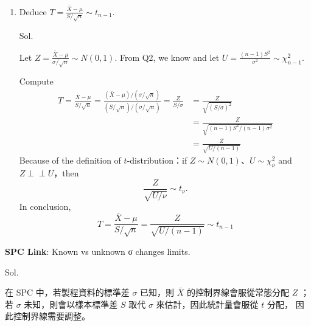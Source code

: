 \documentclass[a4paper, 12pt]{article}  %
\begin{document}
\begin{enumerate}
        Then divide by $\sigma^2$:
        $$\sum_{i=1}^n\left(\frac{X_i-\mu}{\sigma}\right)^2=\sum_{i=1}^n\left(\frac{X_i-\bar X}{\sigma}\right)^2+\left(\frac{\bar X-\mu}{\sigma /\sqrt n}\right)^2.$$
        Let
        $$U=\sum_{i=1}^n\left(\frac{X_i-\mu}{\sigma}\right)^2,　V=\sum_{i=1}^n\left(\frac{X_i-\bar X}{\sigma}\right)^2,　W=\left(\frac{\bar X-\mu}{\sigma /\sqrt n}\right)^2.$$
        Then $U=V+W$, and we can know
        $$U=\sum_{i=1}^n Z_i^2 \sim \chi^2_n,　V=\frac{1}{\sigma^2}\sum_{i=1}^n (X_i-\bar X)^2=\frac{(n-1)S^2}{\sigma^2},$$
        also $\bar X\sim N(\mu,\sigma^2/n)$, hence $$\frac{\bar X-\mu}{\sigma /\sqrt n}\sim N(0,1)\Rightarrow W\sim\chi^2_1.$$
        By (1) and $W$ is a function of $\bar X$ while
        $V=\frac{(n-1)S^2}{\sigma^2}$ is a function of $S^2$, we have $$V\perp \!\!\! \perp W.$$
        From $U=V+W$ and independence, we have $$M_U(t)=M_V(t)\,M_W(t).$$
        By (4), we have $$(1-2t)^{-n/2}=M_U(t)=M_V(t)\,(1-2t)^{-1/2}\Rightarrow M_V(t)=(1-2t)^{-(n-1)/2}.$$
        Since $M_V(t)$ is the mgf of $\chi^2_{n-1}$, finally, $$V=\frac{(n-1)S^2}{\sigma^2}\sim \chi^2_{n-1}.$$

        \item Deduce $T=\frac{\bar{X}-\mu}{S/\sqrt{n}} \sim t_{n-1}$.
        
        Sol.
        
        Let $Z=\frac{\bar X-\mu}{\sigma /\sqrt n}\sim N(0,1)$. From Q2, we know and let $U=\frac{(n-1)S^2}{\sigma^2}\sim \chi^2_{n-1}.$

        Compute
        \begin{align*}
        T=\frac{\bar X-\mu}{S/\sqrt n}=\frac{(\bar X-\mu)/(\sigma /\sqrt n)}{(S/\sqrt n)/(\sigma /\sqrt n)}=\frac{Z}{S/\sigma}
        &=\frac{Z}{\sqrt{(S/\sigma)^2}} \\
        &=\frac{Z}{\sqrt{(n-1)S^2/(n-1)\sigma^2}} \\
        &=\frac{Z}{\sqrt{U/(n-1)}}
        \end{align*}
        Because of the definition of $t$-distribution：if $Z\sim N(0,1)$、$U\sim\chi^2_\nu$ and $Z\perp \!\!\! \perp U$，then $$\frac{Z}{\sqrt{U/\nu}}\sim t_\nu.$$
        In conclusion, $$T=\frac{\bar X-\mu}{S/\sqrt n}=\frac{Z}{\sqrt{U/(n-1)}}\sim t_{n-1}$$

    \end{enumerate}

    \textbf{SPC Link}: Known vs unknown σ changes limits.

    Sol.

    在 SPC 中，若製程資料的標準差 $\sigma$ 已知，則 $\bar{X}$ 的控制界線會服從常態分配 $Z$ ；若 $\sigma$ 未知，則會以樣本標準差 $S$ 取代 $\sigma$ 來估計，因此統計量會服從 $t$ 分配，
    因此控制界線需要調整。
\end{document}
